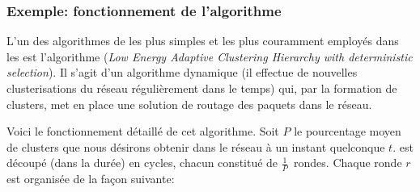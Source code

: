         \subsubsection{Exemple: fonctionnement de l'algorithme \leach}%
        \label{st:subsubsec:leach}
L'un des algorithmes de  les plus simples et les plus couramment employés dans les \rcsfs est l'algorithme \leach (\textit{Low Energy Adaptive Clustering Hierarchy with deterministic \ch selection}).
Il s'agit d'un algorithme dynamique (il effectue de nouvelles clusterisations du réseau régulièrement dans le temps) qui, par la formation de clusters, met en place une solution de routage des paquets dans le réseau.

Voici le fonctionnement détaillé de cet algorithme.
Soit $P$ le pourcentage moyen de clusters que nous désirons obtenir dans le réseau à un instant quelconque $t$.
\leach est découpé (dans la durée) en cycles, chacun constitué de $\frac{1}{P}$~rondes.
Chaque ronde $r$  est organisée de la façon suivante:
